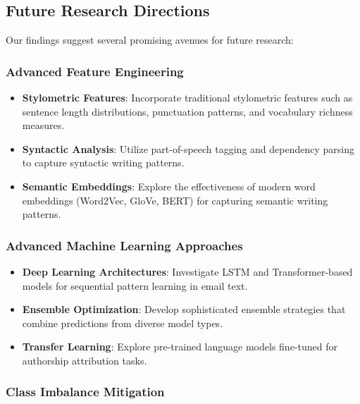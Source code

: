 \documentclass[11pt,a4paper]{article}
\begin{document}
\subsection{Future Research Directions}

Our findings suggest several promising avenues for future research:

\subsubsection{Advanced Feature Engineering}

\begin{itemize}
    \item \textbf{Stylometric Features}: Incorporate traditional stylometric features such as sentence length distributions, punctuation patterns, and vocabulary richness measures.
    
    \item \textbf{Syntactic Analysis}: Utilize part-of-speech tagging and dependency parsing to capture syntactic writing patterns.
    
    \item \textbf{Semantic Embeddings}: Explore the effectiveness of modern word embeddings (Word2Vec, GloVe, BERT) for capturing semantic writing patterns.
\end{itemize}

\subsubsection{Advanced Machine Learning Approaches}

\begin{itemize}
    \item \textbf{Deep Learning Architectures}: Investigate LSTM and Transformer-based models for sequential pattern learning in email text.
    
    \item \textbf{Ensemble Optimization}: Develop sophisticated ensemble strategies that combine predictions from diverse model types.
    
    \item \textbf{Transfer Learning}: Explore pre-trained language models fine-tuned for authorship attribution tasks.
\end{itemize}

\subsubsection{Class Imbalance Mitigation}
\end{document}
